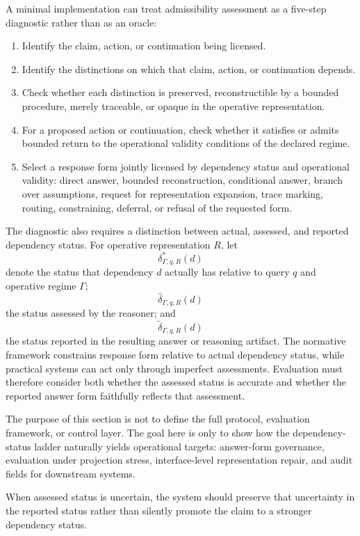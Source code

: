 \documentclass[11pt]{article}
\begin{document}
A minimal implementation can treat admissibility assessment as a five-step diagnostic rather than as an oracle:

\begin{enumerate}
    \item Identify the claim, action, or continuation being licensed.
    \item Identify the distinctions on which that claim, action, or continuation depends.
    \item Check whether each distinction is preserved, reconstructible by a bounded procedure, merely traceable, or opaque in the operative representation.
    \item For a proposed action or continuation, check whether it satisfies or admits bounded return to the operational validity conditions of the declared regime.
    \item Select a response form jointly licensed by dependency status and operational validity: direct answer, bounded reconstruction, conditional answer, branch over assumptions, request for representation expansion, trace marking, routing, constraining, deferral, or refusal of the requested form.
\end{enumerate}

The diagnostic also requires a distinction between actual, assessed, and reported dependency status. For operative representation \(R\), let
\[
\delta^{*}_{\Gamma,q,R}(d)
\]
denote the status that dependency \(d\) actually has relative to query \(q\) and operative regime \(\Gamma\);
\[
\widehat{\delta}_{\Gamma,q,R}(d)
\]
the status assessed by the reasoner; and
\[
\widetilde{\delta}_{\Gamma,q,R}(d)
\]
the status reported in the resulting answer or reasoning artifact. The normative framework constrains response form relative to actual dependency status, while practical systems can act only through imperfect assessments. Evaluation must therefore consider both whether the assessed status is accurate and whether the reported answer form faithfully reflects that assessment.

The purpose of this section is not to define the full protocol, evaluation framework, or control layer. The goal here is only to show how the dependency-status ladder naturally yields operational targets: answer-form governance, evaluation under projection stress, interface-level representation repair, and audit fields for downstream systems.

When assessed status is uncertain, the system should preserve that uncertainty in the reported status rather than silently promote the claim to a stronger dependency status.
\end{document}
